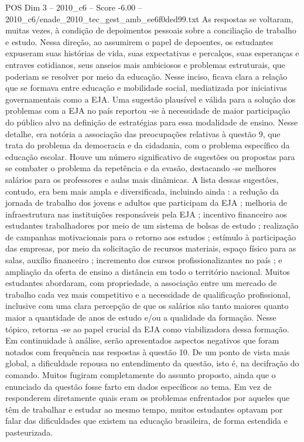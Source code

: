 \begin{textsample}{POS Dim 3 – 2010\_c6 – Score -6.00 – 2010\_c6/enade\_2010\_tec\_gest\_amb\_ee6f0ded99.txt}
As respostas se voltaram, muitas vezes, à condição de depoimentos pessoais sobre a conciliação de trabalho e estudo.
Nessa direção, ao assumirem o papel de depoentes, os estudantes expuseram suas histórias de vida, suas expectativas e percalços, suas esperanças e entraves cotidianos, seus anseios mais ambiciosos e problemas estruturais, que poderiam se resolver por meio da educação.
Nesse inciso, ficava clara a relação que se formava entre educação e mobilidade social, mediatizada por iniciativas governamentais como a EJA.
Uma sugestão plausível e válida para a solução dos problemas com a EJA no país reportou -se à necessidade de maior participação do público alvo na definição de estratégias para essa modalidade de ensino.
Nesse detalhe, era notória a associação das preocupações relativas à questão 9, que trata do problema da democracia e da cidadania, com o problema específico da educação escolar.
Houve um número significativo de sugestões ou propostas para se combater o problema da repetência e da evasão, destacando -se melhores salários para os professores e aulas mais dinâmicas.
A lista dessas sugestões, contudo, era bem mais ampla e diversificada, incluindo ainda : a redução da jornada de trabalho dos jovens e adultos que participam da EJA ; melhoria de infraestrutura nas instituições responsáveis pela EJA ; incentivo financeiro aos estudantes trabalhadores por meio de um sistema de bolsas de estudo ; realização de campanhas motivacionais para o retorno aos estudos ; estímulo à participação das empresas, por meio da solicitação de recursos materiais, espaço físico para as salas, auxílio financeiro ; incremento dos cursos profissionalizantes no país ; e ampliação da oferta de ensino a distância em todo o território nacional.
Muitos estudantes abordaram, com propriedade, a associação entre um mercado de trabalho cada vez mais competitivo e a necessidade de qualificação profissional, inclusive com uma clara percepção de que os salários são tanto maiores quanto maior a quantidade de anos de estudo e/ou a qualidade da formação.
Nesse tópico, retorna -se ao papel crucial da EJA como viabilizadora dessa formação.
Em continuidade à análise, serão apresentados aspectos negativos que foram notados com frequência nas respostas à questão 10.
De um ponto de vista mais global, a dificuldade repousa no entendimento da questão, isto é, na decifração do comando.
Muitos fugiram completamente do assunto proposto, ainda que o enunciado da questão fosse farto em dados específicos ao tema.
Em vez de responderem diretamente quais eram os problemas enfrentados por aqueles que têm de trabalhar e estudar ao mesmo tempo, muitos estudantes optavam por falar das dificuldades que existem na educação brasileira, de forma estendida e pasteurizada.

\end{textsample}
